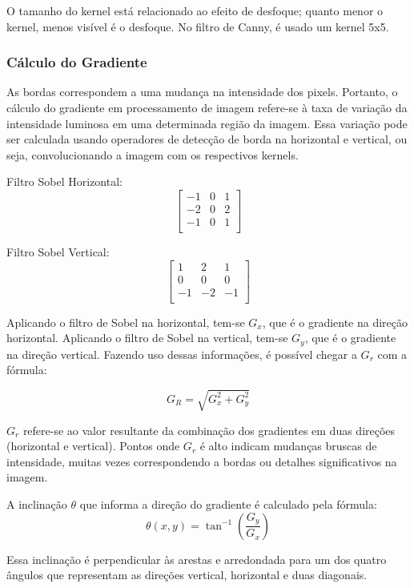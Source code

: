 O tamanho do kernel está relacionado ao efeito de desfoque; quanto menor o kernel, menos visível é o desfoque. No filtro de Canny, é usado um kernel 5x5.




\subsubsection[Cálculo do Gradiente]{Cálculo do Gradiente}

As bordas correspondem a uma mudança na intensidade dos pixels. Portanto, o cálculo do gradiente em processamento de imagem refere-se à taxa de variação da intensidade luminosa em uma determinada região da imagem. Essa variação pode ser calculada usando operadores de detecção de borda na horizontal e vertical, ou seja, convolucionando a imagem com os respectivos kernels.

Filtro Sobel Horizontal:
\[
    \begin{bmatrix}
        -1 & 0 & 1 \\
        -2 & 0 & 2 \\
        -1 & 0 & 1 \\
    \end{bmatrix}
\]

Filtro Sobel Vertical:
\[
    \begin{bmatrix}
        1 & 2 & 1 \\
        0 & 0 & 0 \\
        -1 & -2 & -1 \\
    \end{bmatrix}
\]


Aplicando o filtro de Sobel na horizontal, tem-se $G_x$, que é o gradiente na direção horizontal. Aplicando o filtro de Sobel na vertical, tem-se $G_y$, que é o gradiente na direção vertical. Fazendo uso dessas informações, é possível chegar a $G_r$ com a fórmula:

$$G_R = \sqrt{G_x^2 + G_y^2}$$

$G_r$ refere-se ao valor resultante da combinação dos gradientes em duas direções (horizontal e vertical). Pontos onde $G_r$ é alto indicam mudanças bruscas de intensidade, muitas vezes correspondendo a bordas ou detalhes significativos na imagem. 

A inclinação $\theta$ que informa a direção do gradiente é calculado pela fórmula:
$$\theta(x, y) = \tan^{-1}\left(\frac{G_y}{G_x}\right)$$

Essa inclinação é perpendicular às arestas e arredondada para um dos quatro ângulos que representam as direções vertical, horizontal e duas diagonais.



